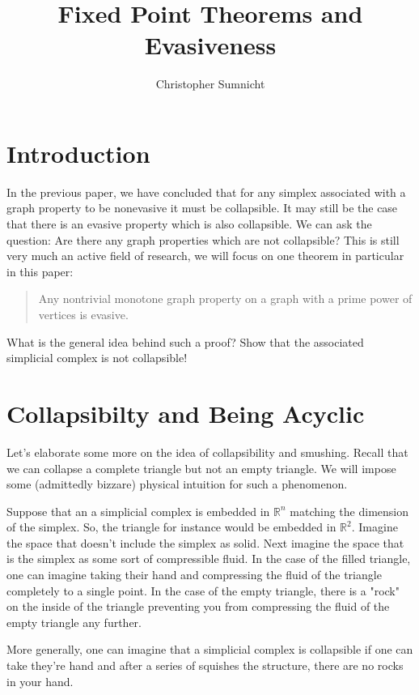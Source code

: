 \documentclass[a4paper]{article}
\begin{document}
\title{Fixed Point Theorems and Evasiveness}
\author{Christopher Sumnicht}
\maketitle

\section{Introduction}

In the previous paper, we have concluded that for any simplex associated with a graph property to be nonevasive it must be collapsible. It may still be the case that there is an evasive property which is also collapsible. We can ask the question: Are there any graph properties which are not collapsible? This is still very much an active field of research, we will focus on one theorem in particular in this paper:

\begin{quote}
    Any nontrivial monotone graph property on a graph with a prime power of vertices is evasive.
\end{quote}

What is the general idea behind such a proof? Show that the associated simplicial complex is not collapsible!


\section{Collapsibilty and Being Acyclic}

Let's elaborate some more on the idea of collapsibility and smushing. Recall that we can collapse a complete triangle but not an empty triangle. We will impose some (admittedly bizzare) physical intuition for such a phenomenon.

Suppose that an a simplicial complex is embedded in $\mathbb{R}^n$ matching the dimension of the simplex. So, the triangle for instance would be embedded in $\mathbb{R}^2$. Imagine the space that doesn't include the simplex as solid. Next imagine the space that is the simplex as some sort of compressible fluid. In the case of the filled triangle, one can imagine taking their hand and compressing the fluid of the triangle completely to a single point. In the case of the empty triangle, there is a "rock" on the inside of the triangle preventing you from compressing the fluid of the empty triangle any further.

More generally, one can imagine that a simplicial complex is collapsible if one can take they're hand and after a series of squishes the structure, there are no rocks in your hand.
\end{document}

